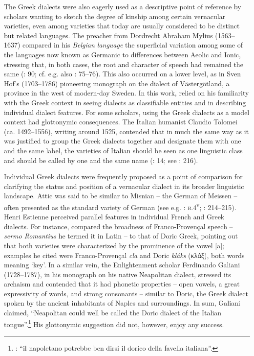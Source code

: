 The Greek dialects were also eagerly used as a descriptive point of reference by scholars wanting to sketch the degree of kinship among certain vernacular varieties, even among varieties that today are usually considered to be distinct but related languages. The preacher from Dordrecht Abraham Mylius (1563–1637) compared in his \textit{Belgian language} the superficial variation among some of the languages now known as Germanic to differences between Aeolic and Ionic, stressing that, in both cases, the root and character of speech had remained the same (\citealt{Mylius1612}: 90; cf. e.g. also \citealt{Boxhorn1647}: 75–76). This also occurred on a lower level, as in Sven Hof’s (1703–1786) pioneering monograph on the dialect of Västergötland, a province in the west of modern-day Sweden. In this work, \citet[esp. 12–13, 23]{Hof1772} relied on his familiarity with the Greek context in seeing dialects as classifiable entities and in describing individual dialect features. For some scholars, using the Greek dialects as a model context had glottonymic consequences. The Italian humanist Claudio Tolomei (ca. 1492–1556), writing around 1525, contended that in much the same way as it was justified to group the Greek dialects together and designate them with one and the same label, the varieties of Italian should be seen as one linguistic class and should be called by one and the same name (\citealt{Tolomei1555}: 14; see \citealt{Trovato1984}: 216).

Individual Greek dialects were frequently proposed as a point of comparison for clarifying the status and position of a vernacular dialect in its broader linguistic landscape. Attic was said to be similar to Misnian – the German of Meissen – often presented as the standard variety of German (see e.g. \citealt{Borner1705}: \textsc{b.4}\textsc{\textsuperscript{v}}; \citealt{Simonis1752}: 214–215). Henri Estienne perceived parallel features in individual French and Greek dialects. For instance, \citet[3--4]{Estienne1582} compared the broadness of Franco-Provençal speech – \textit{sermo Romantius} he termed it in Latin – to that of Doric Greek, pointing out that both varieties were characterized by the prominence of the vowel [a]; examples he cited were Franco-Provençal \textit{cla} and Doric \textit{kláks} (κλάξ), both words meaning ‘key’. In a similar vein, the Enlightenment scholar Ferdinando Galiani (1728–1787), in his monograph on his native Neapolitan dialect, stressed its archaism and contended that it had phonetic properties – open vowels, a great expressivity of words, and strong consonants – similar to Doric, the Greek dialect spoken by the ancient inhabitants of Naples and surroundings. In sum, Galiani claimed, “Neapolitan could well be called the Doric dialect of the Italian tongue”.\footnote{\citet[16]{Galiani1779}: “il napoletano potrebbe ben dirsi il dorico della favella italiana”.} His glottonymic suggestion did not, however, enjoy any success.


